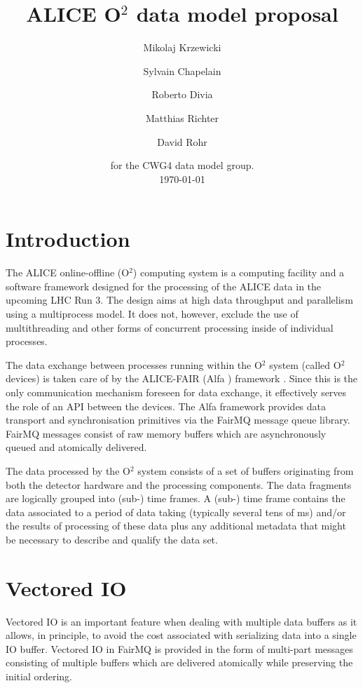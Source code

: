 \documentclass[a4paper,twoside]{article}
\def\O2{O$^2$}
\begin{document}
\title{ALICE \O2 data model proposal}

\author{Mikolaj Krzewicki \and Sylvain Chapelain \and Roberto Divia \and Matthias Richter \and David Rohr}
\date{
for the CWG4 data model group.\\[2ex]
\today
}
\maketitle

\section{Introduction}

The ALICE online-offline (\O2) computing system \cite{o2tdr,o2} is a computing facility and a software framework designed for the processing of the ALICE data in the upcoming LHC Run 3.
The design aims at high data throughput and parallelism using a multiprocess model.
It does not, however, exclude the use of multithreading and other forms of concurrent processing inside of individual processes.

The data exchange between processes running within the \O2 system (called \O2 devices) is taken care of by the ALICE-FAIR (Alfa ) framework \cite{alfa}. Since this is the only communication mechanism foreseen for data exchange, it effectively serves the role of an API between the devices.
The Alfa framework provides data transport and synchronisation primitives via the FairMQ message queue library. FairMQ messages consist of raw memory buffers which are asynchronously queued and atomically delivered.

The data processed by the \O2 system consists of a set of buffers originating from both the detector hardware and the processing components. The data fragments are logically grouped into (sub-) time frames. A (sub-) time frame contains the data associated to a period of data taking (typically several tens of ms) and/or the results of processing of these data plus any additional metadata that might be necessary to describe and qualify the data set.

\section{Vectored IO}

Vectored IO is an important feature when dealing with multiple data buffers as it allows, in principle, to avoid the cost associated with serializing data into a single IO buffer.
Vectored IO in FairMQ is provided in the form of multi-part messages consisting of multiple buffers which are delivered atomically while preserving the initial ordering.
\end{document}
